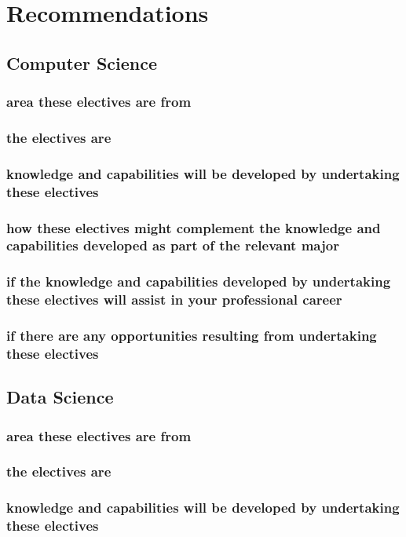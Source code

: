 \documentclass{article}
\begin{document}
\section{Recommendations}
	\subsection{Computer Science}
		\subsubsection{area these electives are from}
		\subsubsection{the electives are}
		\subsubsection{knowledge and capabilities will be developed by undertaking these electives} 
		\subsubsection{how these electives might complement the knowledge and capabilities developed as part of the relevant major}
		\subsubsection{if the knowledge and capabilities developed by undertaking these electives will assist in your professional career}
		\subsubsection{if there are any opportunities resulting from undertaking these electives}
		\pagebreak
	\subsection{Data Science}
		\subsubsection{area these electives are from}
		\subsubsection{the electives are}
		\subsubsection{knowledge and capabilities will be developed by undertaking these electives} 
\end{document}
